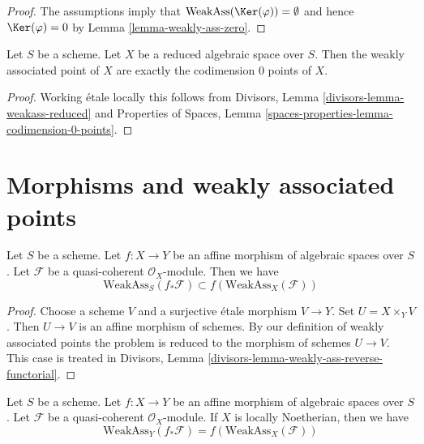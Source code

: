 \begin{proof}
The assumptions imply that $\text{WeakAss}(\Ker(\varphi)) = \emptyset$
and hence $\Ker(\varphi) = 0$ by Lemma \ref{lemma-weakly-ass-zero}.
\end{proof}

\begin{lemma}
\label{lemma-weakass-reduced}
Let $S$ be a scheme. Let $X$ be a reduced algebraic space over $S$.
Then the weakly associated point of $X$ are exactly the codimension $0$
points of $X$.
\end{lemma}

\begin{proof}
Working \'etale locally this follows from
Divisors, Lemma \ref{divisors-lemma-weakass-reduced}
and
Properties of Spaces, Lemma \ref{spaces-properties-lemma-codimension-0-points}.
\end{proof}










\section{Morphisms and weakly associated points}
\label{section-morphisms-weakly-associated}

\begin{lemma}
\label{lemma-weakly-ass-reverse-functorial}
Let $S$ be a scheme.
Let $f : X \to Y$ be an affine morphism of algebraic spaces over $S$.
Let $\mathcal{F}$ be a quasi-coherent $\mathcal{O}_X$-module.
Then we have
$$
\text{WeakAss}_S(f_*\mathcal{F}) \subset f(\text{WeakAss}_X(\mathcal{F}))
$$
\end{lemma}

\begin{proof}
Choose a scheme $V$ and a surjective \'etale morphism $V \to Y$.
Set $U = X \times_Y V$. Then $U \to V$ is an affine morphism
of schemes. By our definition of weakly associated points
the problem is reduced to the morphism of schemes $U \to V$. This case is
treated in Divisors, Lemma \ref{divisors-lemma-weakly-ass-reverse-functorial}.
\end{proof}

\begin{lemma}
\label{lemma-ass-functorial-equal}
Let $S$ be a scheme.
Let $f : X \to Y$ be an affine morphism of algebraic spaces over $S$.
Let $\mathcal{F}$ be a quasi-coherent $\mathcal{O}_X$-module.
If $X$ is locally Noetherian, then we have
$$
\text{WeakAss}_Y(f_*\mathcal{F}) =
f(\text{WeakAss}_X(\mathcal{F}))
$$
\end{lemma}

